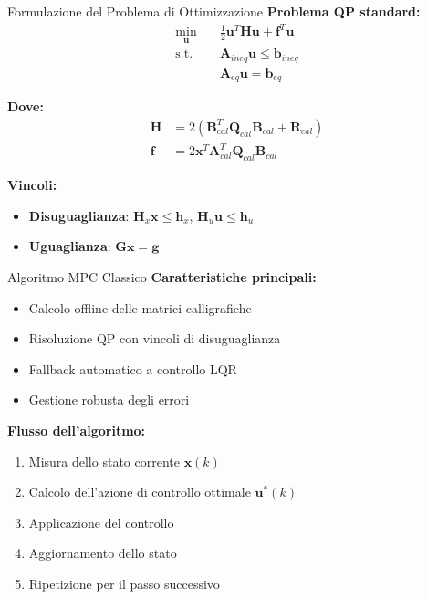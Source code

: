\documentclass[beamer]{beamer}
\begin{document}
\begin{frame}{Formulazione del Problema di Ottimizzazione}
    \textbf{Problema QP standard:}
    \begin{align}
        \min_{\mathbf{u}} \quad & \frac{1}{2}\mathbf{u}^T\mathbf{H}\mathbf{u} + \mathbf{f}^T\mathbf{u} \\
        \text{s.t.} \quad & \mathbf{A}_{ineq}\mathbf{u} \leq \mathbf{b}_{ineq} \\
        & \mathbf{A}_{eq}\mathbf{u} = \mathbf{b}_{eq}
    \end{align}
    
    \textbf{Dove:}
    \begin{align}
        \mathbf{H} &= 2(\mathbf{B}_{cal}^T\mathbf{Q}_{cal}\mathbf{B}_{cal} + \mathbf{R}_{cal}) \\
        \mathbf{f} &= 2\mathbf{x}^T\mathbf{A}_{cal}^T\mathbf{Q}_{cal}\mathbf{B}_{cal}
    \end{align}
    
    \textbf{Vincoli:}
    \begin{itemize}
        \item \textbf{Disuguaglianza}: $\mathbf{H}_x\mathbf{x} \leq \mathbf{h}_x$, $\mathbf{H}_u\mathbf{u} \leq \mathbf{h}_u$
        \item \textbf{Uguaglianza}: $\mathbf{G}\mathbf{x} = \mathbf{g}$
    \end{itemize}
\end{frame}

\begin{frame}{Algoritmo MPC Classico}
    \textbf{Caratteristiche principali:}
    \begin{itemize}
        \item Calcolo offline delle matrici calligrafiche
        \item Risoluzione QP con vincoli di disuguaglianza
        \item Fallback automatico a controllo LQR
        \item Gestione robusta degli errori
    \end{itemize}
    
    \textbf{Flusso dell'algoritmo:}
    \begin{enumerate}
        \item Misura dello stato corrente $\mathbf{x}(k)$
        \item Calcolo dell'azione di controllo ottimale $\mathbf{u}^*(k)$
        \item Applicazione del controllo
        \item Aggiornamento dello stato
        \item Ripetizione per il passo successivo
    \end{enumerate}
\end{frame}
\end{document}
